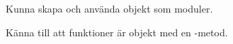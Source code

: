 
\item Kunna skapa och använda objekt som moduler.
\item Känna till att funktioner är objekt med en -metod.
\item {}

